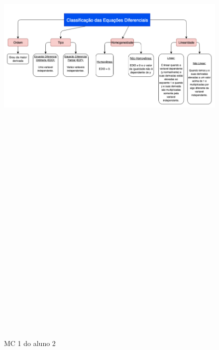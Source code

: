 \begin{landscape}
\begin{figure}[H]
\centering
\caption{MC 1 do aluno 2}
\includegraphics[width=220mm, height=290mm,keepaspectratio]{figuras/MC/mc2_1.png}
\label{mc1a2}
\end{figure}
\end{landscape}

